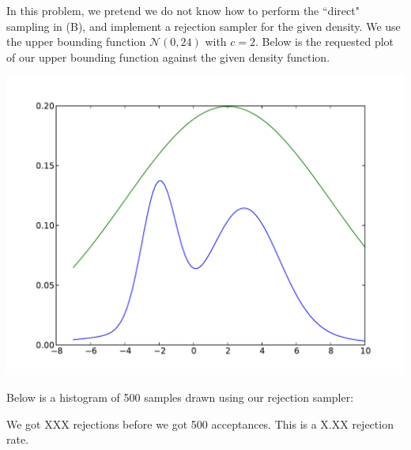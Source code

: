 \documentclass[solution, letterpaper]{cs121}
\begin{document}
\begin{empfile}
\subproblem %
In this problem, we pretend we do not know how to perform the ``direct" sampling in (B), and implement a rejection sampler for the given density. We use the upper bounding function $\mathcal{N}(0,24)$ with $c=2$. Below is the requested plot of our upper bounding function against the given density function.
\begin{center}
\includegraphics[scale=0.8]{mixture-w-envelope.pdf}
\end{center}

Below is a histogram of 500 samples drawn using our rejection sampler:
\begin{center}
\end{center}

We got XXX rejections before we got 500 acceptances. This is a X.XX rejection rate.

\end{empfile}

\immediate{}
\end{document}
